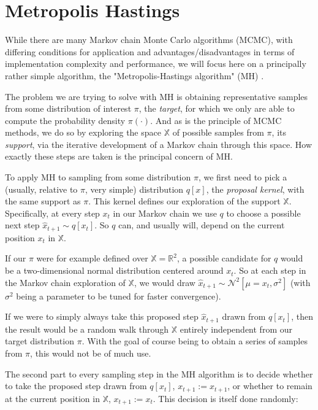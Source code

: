 \section{Metropolis Hastings}

While there are many Markov chain Monte Carlo algorithms (MCMC), with differing conditions for application and advantages/disadvantages in terms of implementation complexity and performance, we will focus here on a principally rather simple algorithm, the "Metropolis-Hastings algorithm" (MH) \cite{metropolis1953equation} \cite{hastings1970monte}.

The problem we are trying to solve with MH is obtaining representative samples from some distribution of interest $\pi$, the \textit{target}, for which we only are able to compute the probability density $\pi(\cdot)$. And as is the principle of MCMC methods, we do so by exploring the space $\mathbb{X}$ of possible samples from $\pi$, its \textit{support}, via the iterative development of a Markov chain through this space. How exactly these steps are taken is the principal concern of MH.

To apply MH to sampling from some distribution $\pi$, we first need to pick a (usually, relative to $\pi$, very simple) distribution $q[x]$, the \textit{proposal kernel}, with the same support as $\pi$. This kernel defines our exploration of the support $\mathbb{X}$. Specifically, at every step $x_t$ in our Markov chain we use $q$ to choose a possible next step $\hat{x}_{t+1} \sim q[x_t]$. So $q$ can, and usually will, depend on the current position $x_t$ in $\mathbb{X}$.

If our $\pi$ were for example defined over $\mathbb{X} = \mathbb{R}^2$, a possible candidate for $q$ would be a two-dimensional normal distribution centered around $x_t$. So at each step in the Markov chain exploration of $\mathbb{X}$, we would draw $\hat{x}_{t+1} \sim \mathcal{N}^2[\mu = x_t, \sigma^2]$ (with $\sigma^2$ being a parameter to be tuned for faster convergence).

If we were to simply always take this proposed step $\hat{x}_{t+1}$ drawn from $q[x_t]$, then the result would be a random walk through $\mathbb{X}$ entirely independent from our target distribution $\pi$. With the goal of course being to obtain a series of samples from $\pi$, this would not be of much use.

The second part to every sampling step in the MH algorithm is to decide whether to take the proposed step drawn from $q[x_t]$, $x_{t+1} := \hat{x}_{t+1}$, or whether to remain at the current position in $\mathbb{X}$, $x_{t+1} := x_t$. This decision is itself done randomly:

